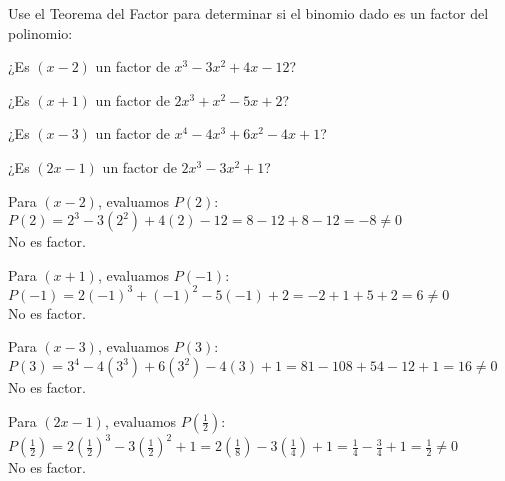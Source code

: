 \begin{exercise}
\problem Use el Teorema del Factor para determinar si el binomio dado es un factor del polinomio:

\begin{exerciselist}
    \item ¿Es $(x - 2)$ un factor de $x^3 - 3x^2 + 4x - 12$?
    \item ¿Es $(x + 1)$ un factor de $2x^3 + x^2 - 5x + 2$?
    \item ¿Es $(x - 3)$ un factor de $x^4 - 4x^3 + 6x^2 - 4x + 1$?
    \item ¿Es $(2x - 1)$ un factor de $2x^3 - 3x^2 + 1$?
\end{exerciselist}

\begin{solucion}
\begin{exerciselist}
    \item Para $(x - 2)$, evaluamos $P(2)$:\\
    $P(2) = 2^3 - 3(2^2) + 4(2) - 12 = 8 - 12 + 8 - 12 = -8 \neq 0$\\
    No es factor.
    
    \item Para $(x + 1)$, evaluamos $P(-1)$:\\
    $P(-1) = 2(-1)^3 + (-1)^2 - 5(-1) + 2 = -2 + 1 + 5 + 2 = 6 \neq 0$\\
    No es factor.
    
    \item Para $(x - 3)$, evaluamos $P(3)$:\\
    $P(3) = 3^4 - 4(3^3) + 6(3^2) - 4(3) + 1 = 81 - 108 + 54 - 12 + 1 = 16 \neq 0$\\
    No es factor.
    
    \item Para $(2x - 1)$, evaluamos $P(\frac{1}{2})$:\\
    $P(\frac{1}{2}) = 2(\frac{1}{2})^3 - 3(\frac{1}{2})^2 + 1 = 2(\frac{1}{8}) - 3(\frac{1}{4}) + 1 = \frac{1}{4} - \frac{3}{4} + 1 = \frac{1}{2} \neq 0$\\
    No es factor.
\end{exerciselist}
\end{solucion}
\end{exercise}


